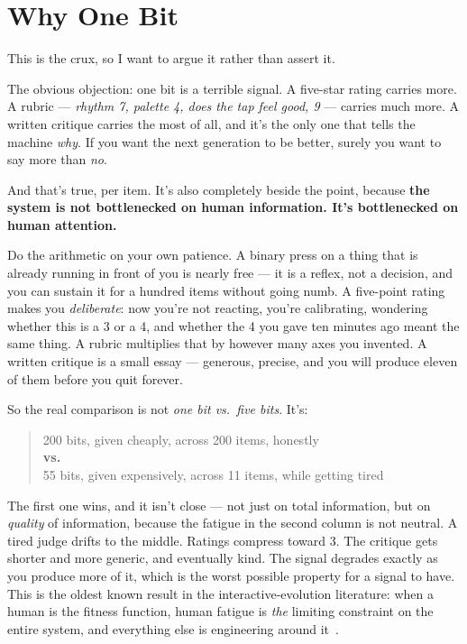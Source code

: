 \documentclass[10pt,letterpaper,twocolumn]{article}
\begin{document}

\section{Why One Bit}

This is the crux, so I want to argue it rather than assert it.

The obvious objection: one bit is a terrible signal. A five-star rating carries more. A rubric --- \emph{rhythm 7, palette 4, does the tap feel good, 9} --- carries much more. A written critique carries the most of all, and it's the only one that tells the machine \emph{why}. If you want the next generation to be better, surely you want to say more than \emph{no}.

And that's true, per item. It's also completely beside the point, because \textbf{the system is not bottlenecked on human information. It's bottlenecked on human attention.}

Do the arithmetic on your own patience. A binary press on a thing that is already running in front of you is nearly free --- it is a reflex, not a decision, and you can sustain it for a hundred items without going numb. A five-point rating makes you \emph{deliberate}: now you're not reacting, you're calibrating, wondering whether this is a 3 or a 4, and whether the 4 you gave ten minutes ago meant the same thing. A rubric multiplies that by however many axes you invented. A written critique is a small essay --- generous, precise, and you will produce eleven of them before you quit forever.

So the real comparison is not \emph{one bit vs.\ five bits}. It's:

\begin{quote}
\small 200 bits, given cheaply, across 200 items, honestly \\
\hspace*{1.2em}\textbf{vs.} \\
55 bits, given expensively, across 11 items, while getting tired
\end{quote}

The first one wins, and it isn't close --- not just on total information, but on \emph{quality} of information, because the fatigue in the second column is not neutral. A tired judge drifts to the middle. Ratings compress toward 3. The critique gets shorter and more generic, and eventually kind. The signal degrades exactly as you produce more of it, which is the worst possible property for a signal to have. This is the oldest known result in the interactive-evolution literature: when a human is the fitness function, human fatigue is \emph{the} limiting constraint on the entire system, and everything else is engineering around it~\citep{takagi2001}.
\end{document}
